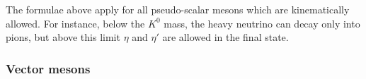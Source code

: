 The formulae above apply for all pseudo-scalar mesons which are kinematically allowed.
For instance, below the $K^0$ mass, the heavy neutrino can decay only into pions, %
but above this limit $\eta$ and $\eta'$ are allowed in the final state.
%	

\subsubsection{Vector mesons}
\label{sec:decay_vector}

